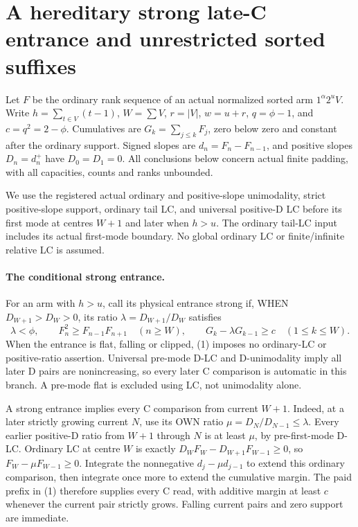 \section{A hereditary strong late-C entrance and unrestricted sorted suffixes}
Let $F$ be the ordinary rank sequence of an actual normalized sorted arm
$1^\alpha2^uV$. Write $h=\sum_{t\in V}(t-1)$, $W=\sum V$,
$r=|V|$, $w=u+r$, $q=\phi-1$, and $c=q^2=2-\phi$.
Cumulatives are $G_k=\sum_{j\le k}F_j$, zero below zero and constant
after the ordinary support. Signed slopes are $d_n=F_n-F_{n-1}$,
and positive slopes $D_n=d_n^+$ have $D_0=D_1=0$.
All conclusions below concern actual finite padding, with all capacities,
counts and ranks unbounded.

We use the registered actual ordinary and positive-slope unimodality,
strict positive-slope support, ordinary tail LC, and universal positive-D
LC before its first mode at centres $W+1$ and later when $h>u$.
The ordinary tail-LC input includes its actual first-mode boundary.
No global ordinary LC or finite/infinite relative LC is assumed.

\paragraph{The conditional strong entrance.}
For an arm with $h>u$, call its physical entrance strong if, WHEN
$D_{W+1}>D_W>0$, its ratio $\lambda=D_{W+1}/D_W$ satisfies
\[
 \lambda<\phi,\qquad
 F_n^2\ge F_{n-1}F_{n+1}\quad(n\ge W),\qquad
 G_k-\lambda G_{k-1}\ge c\quad(1\le k\le W).       \tag{1}
\]
When the entrance is flat, falling or clipped, (1) imposes no
ordinary-LC or positive-ratio assertion. Universal pre-mode D-LC
and D-unimodality imply all later D pairs are nonincreasing,
so every later C comparison is automatic in this branch.
A pre-mode flat is excluded using LC, not unimodality alone.

A strong entrance implies every C comparison from current $W+1$.
Indeed, at a later strictly growing current $N$, use its OWN ratio
$\mu=D_N/D_{N-1}\le\lambda$. Every earlier positive-D ratio from
$W+1$ through $N$ is at least $\mu$, by pre-first-mode D-LC.
Ordinary LC at centre $W$ is exactly
$D_WF_W-D_{W+1}F_{W-1}\ge0$, so $F_W-\mu F_{W-1}\ge0$.
Integrate the nonnegative $d_j-\mu d_{j-1}$ to extend this ordinary
comparison, then integrate once more to extend the cumulative margin.
The paid prefix in (1) therefore supplies every C read, with additive
margin at least $c$ whenever the current pair strictly grows.
Falling current pairs and zero support are immediate.

